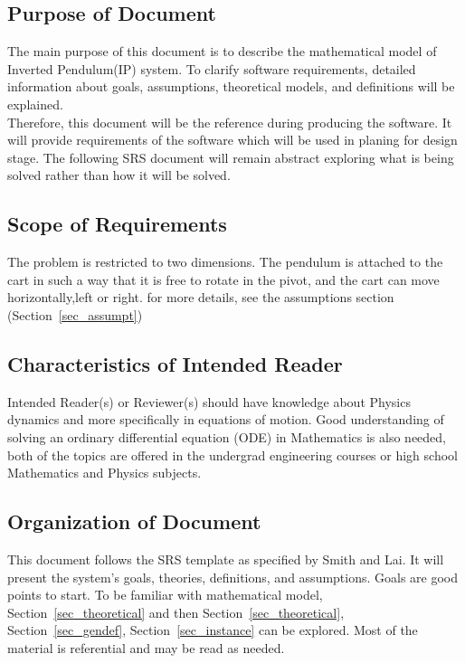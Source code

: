 \documentclass[12pt]{article}
\begin{document}
\subsection{Purpose of Document}

The main purpose of this document is to describe the mathematical model of Inverted Pendulum(IP) system. To clarify software requirements, detailed information about goals, assumptions, theoretical models, and definitions will be explained.\\
Therefore, this document will be the reference during producing the software. It will provide  requirements of the software which will be used in
planing for design stage.
The following SRS document will remain abstract exploring what is being solved rather than how it will be solved.

\subsection{Scope of Requirements} 

The problem is restricted to two dimensions. The pendulum is attached to the cart in such a way that it is free to rotate in the pivot, and the cart can move horizontally,left or right. for more details, see the assumptions section  (Section~\ref{sec_assumpt})
 
\subsection{Characteristics of Intended Reader} \label{sec_IntendedReader}
Intended Reader(s) or Reviewer(s) should have knowledge about Physics dynamics and more specifically in equations of motion. Good understanding of solving an ordinary differential equation (ODE) in Mathematics is also needed, both of the topics are offered in the undergrad engineering courses or high school Mathematics and Physics subjects.


\subsection{Organization of Document}

This document follows the SRS template as specified by Smith and Lai\cite{SmithAndLai2005}. It will present the system's goals, theories, definitions, and assumptions. Goals are good points to start. To be familiar with mathematical model, Section~\ref{sec_theoretical} and then Section~\ref{sec_theoretical}, Section~\ref{sec_gendef}, Section~\ref{sec_instance} can be explored. Most of the material is referential and may be read as needed.
\end{document}
